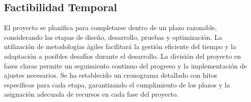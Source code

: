 \subsection{Factibilidad Temporal}
El proyecto se planifica para completarse dentro de un plazo razonable, considerando las etapas de diseño, desarrollo, pruebas y optimización. La utilización de metodologías ágiles facilitará la gestión eficiente del tiempo y la adaptación a posibles desafíos durante el desarrollo. La división del proyecto en fases claras permite un seguimiento continuo del progreso y la implementación de ajustes necesarios. Se ha establecido un cronograma detallado con hitos específicos para cada etapa, garantizando el cumplimiento de los plazos y la asignación adecuada de recursos en cada fase del proyecto.
